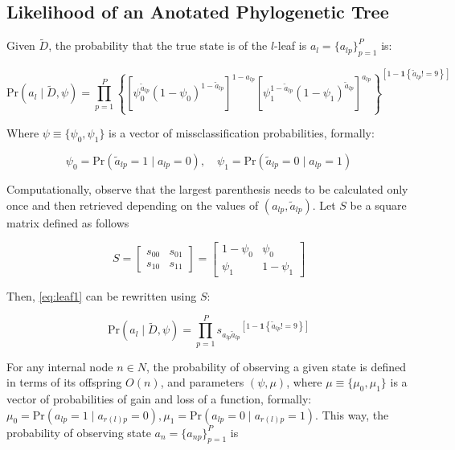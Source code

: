 \documentclass{article}
\newcommand{\isone}[1]{{\boldsymbol{1}\left\{ #1 \right\}}}
\newcommand{\Prcond}[2]{{\mbox{Pr}\left(#1\;|\;#2\right) }}
\begin{document}
\subsection{Likelihood of an Anotated Phylogenetic Tree}

Given $\tilde D$, the probability that the true state is of the $l$-leaf is $a_l = \{a_{lp}\}_{p=1}^P$ is:

\begin{equation}
\label{eq:leaf1}
\Prcond{a_l}{\tilde D, \psi} = \prod_{p = 1}^P\left\{\left[\psi_0^{\tilde a_{lp}}(1-\psi_0)^{1- \tilde a_{lp}}\right]^{1- a_{lp}} \left[\psi_1^{1- \tilde a_{lp}}(1-\psi_1)^{\tilde a_{lp}}\right]^{a_{lp}} \right\}^{\left[1 - \isone{\tilde a_{lp} !=9}\right]}
\end{equation}

Where $\psi\equiv\{\psi_0, \psi_1\}$ is a vector of missclassification probabilities, formally:

$$
\psi_0 = \Prcond{\tilde a_{lp}=1}{a_{lp} = 0},\quad
\psi_1 = \Prcond{\tilde a_{lp}=0}{a_{lp} = 1}
$$

Computationally, observe that the largest parenthesis needs to be calculated only once and then retrieved depending on the values of $(a_{lp},\tilde a_{lp})$. Let $S$ be a square matrix defined as follows

$$
S = \left[\begin{array}{cc}
s_{00} & s_{01} \\
s_{10} & s_{11}
\end{array}\right]
=\left[\begin{array}{cc}
1-\psi_0 & \psi_0 \\
\psi_1 & 1 - \psi_1
\end{array}\right]
$$

Then, \eqref{eq:leaf1} can be rewritten using $S$:

\begin{equation}
\label{eq:leaf2}
\Prcond{a_l}{\tilde D, \psi} = \prod_{p = 1}^P {s_{a_{lp} \tilde a_{lp}}}^{\left[1 - \isone{\tilde a_{lp} !=9}\right]}
\end{equation}

For any internal node $n \in N$, the probability of observing a given state is defined in terms of its offspring $O(n)$, and parameters $(\psi, \mu)$, where $\mu \equiv \{\mu_0,\mu_1\}$ is a vector of probabilities of gain and loss of a function, formally: $
\mu_0 = \Prcond{a_{lp} = 1}{a_{r(l)p} = 0}, \mu_1 = \Prcond{a_{lp} = 0}{a_{r(l)p} = 1}
$. This way, the probability of observing state $a_n = \{a_{np}\}_{p=1}^P$ is
\end{document}
